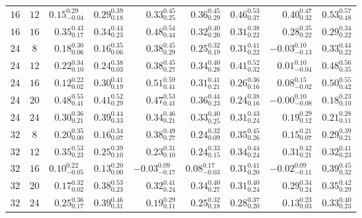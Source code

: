 \begin{table}[!tbp]
\begin{tabular}{@{}ccrrrrrrr@{}}
        $16$ & $12$ & $0.15_{-0.04}^{0.29}$ & $0.29_{0.18}^{0.39}$ & $0.33_{0.25}^{0.45}$ & $0.36_{0.29}^{0.45}$ & $0.46_{0.37}^{0.53}$ & $0.40_{0.32}^{0.47}$ & $0.53_{0.48}^{0.57}$ \\
        $16$ & $16$ & $0.35_{0.17}^{0.43}$ & $0.34_{0.23}^{0.44}$ & $0.48_{0.44}^{0.54}$ & $0.32_{0.20}^{0.40}$ & $0.31_{0.22}^{0.38}$ & $0.28_{0.22}^{0.35}$ & $0.29_{0.22}^{0.34}$ \\
        \addlinespace[2pt]
        $24$ & $8$ & $0.18_{0.06}^{0.30}$ & $0.16_{0.06}^{0.35}$ & $0.38_{0.29}^{0.45}$ & $0.25_{0.19}^{0.32}$ & $0.31_{0.22}^{0.41}$ & $-0.03_{-0.13}^{0.10}$ & $0.33_{0.22}^{0.44}$ \\
        $24$ & $12$ & $0.22_{0.10}^{0.34}$ & $0.24_{0.03}^{0.38}$ & $0.38_{0.27}^{0.45}$ & $0.34_{0.28}^{0.40}$ & $0.41_{0.32}^{0.52}$ & $0.01_{-0.04}^{0.10}$ & $0.48_{0.35}^{0.56}$ \\
        $24$ & $16$ & $0.12_{0.02}^{0.22}$ & $0.30_{0.19}^{0.41}$ & $0.51_{0.41}^{0.59}$ & $0.31_{0.21}^{0.41}$ & $0.26_{0.16}^{0.36}$ & $0.08_{-0.02}^{0.15}$ & $0.50_{0.42}^{0.55}$ \\
        $24$ & $20$ & $0.48_{0.41}^{0.55}$ & $0.41_{0.29}^{0.52}$ & $0.47_{0.41}^{0.53}$ & $0.36_{0.23}^{0.44}$ & $0.24_{0.16}^{0.38}$ & $-0.00_{-0.08}^{0.10}$ & $0.18_{0.10}^{0.23}$ \\
        $24$ & $24$ & $0.30_{0.21}^{0.36}$ & $0.39_{0.33}^{0.44}$ & $0.34_{0.21}^{0.46}$ & $0.33_{0.25}^{0.40}$ & $0.31_{0.24}^{0.43}$ & $0.19_{0.12}^{0.29}$ & $0.21_{0.11}^{0.28}$ \\
        \addlinespace[2pt]
        $32$ & $8$ & $0.20_{0.00}^{0.35}$ & $0.16_{0.07}^{0.34}$ & $0.38_{0.27}^{0.49}$ & $0.24_{0.09}^{0.32}$ & $0.35_{0.26}^{0.45}$ & $0.15_{0.07}^{0.21}$ & $0.29_{0.21}^{0.39}$ \\
        $32$ & $12$ & $0.35_{0.23}^{0.53}$ & $0.25_{0.10}^{0.39}$ & $0.23_{0.10}^{0.31}$ & $0.24_{0.15}^{0.33}$ & $0.34_{0.24}^{0.44}$ & $0.31_{0.21}^{0.42}$ & $0.32_{0.23}^{0.41}$ \\
        $32$ & $16$ & $0.10_{-0.05}^{0.22}$ & $0.13_{0.00}^{0.20}$ & $-0.03_{-0.17}^{0.09}$ & $0.08_{-0.03}^{0.17}$ & $0.31_{0.20}^{0.41}$ & $-0.02_{-0.11}^{0.09}$ & $0.39_{0.32}^{0.45}$ \\
        $32$ & $20$ & $0.17_{0.02}^{0.32}$ & $0.38_{0.23}^{0.53}$ & $0.32_{0.24}^{0.41}$ & $0.34_{0.27}^{0.40}$ & $0.31_{0.24}^{0.40}$ & $0.29_{0.24}^{0.34}$ & $0.35_{0.29}^{0.42}$ \\
        $32$ & $24$ & $0.25_{0.17}^{0.36}$ & $0.39_{0.31}^{0.46}$ & $0.19_{0.11}^{0.29}$ & $0.25_{0.18}^{0.32}$ & $0.28_{0.20}^{0.37}$ & $0.13_{0.03}^{0.23}$ & $0.33_{0.23}^{0.40}$ \\

\end{tabular}
\end{table}
